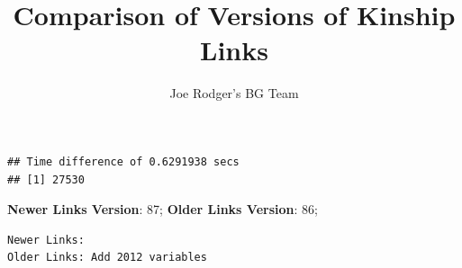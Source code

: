 \documentclass[a4paper]{article}\usepackage[]{graphicx}\usepackage[]{color}
\title{Comparison of Versions of Kinship Links}
\author{Joe Rodger's BG Team}
\makeatletter
\newenvironment{kframe}{%
 \def\at@end@of@kframe{}%
 \ifinner\ifhmode%
  \def\at@end@of@kframe{\end{minipage}}%
  \begin{minipage}{\columnwidth}%
 \fi\fi%
 \def\FrameCommand##1{\hskip\@totalleftmargin \hskip-\fboxsep
 \colorbox{shadecolor}{##1}\hskip-\fboxsep
     \hskip-\linewidth \hskip-\@totalleftmargin \hskip\columnwidth}%
 \MakeFramed {\advance\hsize-\width
   \@totalleftmargin\z@ \linewidth\hsize
   \@setminipage}}%
 {\par\unskip\endMakeFramed%
 \at@end@of@kframe}
\newenvironment{knitrout}{}{} %
\makeatother
\begin{document}
\maketitle

\setlength{\parindent}{0pt}%
















\begin{knitrout}
\color{fgcolor}\begin{kframe}
\begin{verbatim}
## Time difference of 0.6291938 secs
## [1] 27530
\end{verbatim}
\end{kframe}
\end{knitrout}



\textbf{Newer Links Version}: 87;
\textbf{Older Links Version}: 86;




\begin{knitrout}
\color{fgcolor}\begin{kframe}
\begin{verbatim}
Newer Links:
Older Links: Add 2012 variables
\end{verbatim}
\end{kframe}
\end{knitrout}
\end{document}
